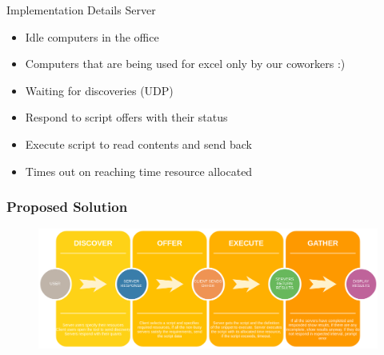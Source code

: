 \documentclass{beamer}
\begin{document}
\begin{frame}{Implementation Details}
\quad Server \\
\begin{itemize}
    \item Idle computers in the office
    \item Computers that are being used for excel only by our coworkers :)
    \item Waiting for discoveries (UDP)
    \item Respond to script offers with their status
    \item Execute script to read contents and send back
    \item Times out on reaching time resource allocated 
\end{itemize}
\end{frame}


\begin{frame}
\frametitle{Proposed Solution}
\begin{figure}
\includegraphics[width=1\linewidth]{flow.png}
\end{figure}
\end{frame}


\end{document}
